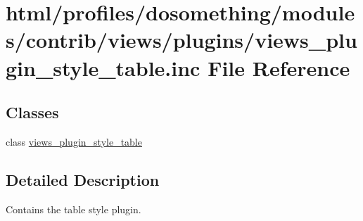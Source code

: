 \hypertarget{views__plugin__style__table_8inc}{
\section{html/profiles/dosomething/modules/contrib/views/plugins/views\_\-plugin\_\-style\_\-table.inc File Reference}
\label{views__plugin__style__table_8inc}
}
\subsection*{Classes}
\begin{DoxyCompactItemize}
\item 
class \hyperlink{classviews__plugin__style__table}{views\_\-plugin\_\-style\_\-table}
\end{DoxyCompactItemize}


\subsection{Detailed Description}
Contains the table style plugin. 